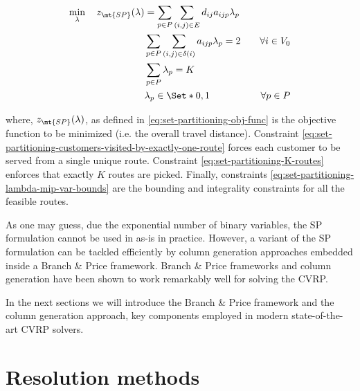 \begin{align}
	\min_{\lambda} \quad z_\mt{SP}(\lambda) & = \sum_{p \in P} \sum_{(i, j) \in E} d_{ij} a_{ijp} \lambda_p \label{eq:set-partitioning-obj-func}                                                                                                                                           \\
	                                        & \sum_{p \in P} \sum_{(i, j) \in \delta(i)} a_{ijp} \lambda_p = 2                                   & \quad \forall i \in V_0                                              \label{eq:set-partitioning-customers-visited-by-exactly-one-route} \\
	                                        & \sum_{p \in P} \lambda_{p} = K\label{eq:set-partitioning-K-routes}                                                                                                                                                                           \\
	                                        & \lambda_p                    \in \Set*{0, 1}                                                       & \quad \forall p \in P \label{eq:set-partitioning-lambda-mip-var-bounds}
\end{align}

where, $z_\mt{SP}(\lambda)$, as defined in \eqref{eq:set-partitioning-obj-func} is the objective function to be minimized (i.e. the overall travel distance).
Constraint \eqref{eq:set-partitioning-customers-visited-by-exactly-one-route} forces each customer to be served from a single unique route.
Constraint \eqref{eq:set-partitioning-K-routes} enforces that exactly $K$ routes are picked.
Finally, constraints \eqref{eq:set-partitioning-lambda-mip-var-bounds} are the bounding and integrality constraints for all the feasible routes.


As one may guess, due the exponential number of binary variables, the SP formulation cannot be used in as-is in practice.
However, a variant of the SP formulation can be tackled efficiently by column generation approaches embedded inside a Branch \& Price framework.
Branch \& Price frameworks and column generation have been shown to work remarkably well for solving the CVRP.

In the next sections we will introduce the Branch \& Price framework and the column generation approach, key components employed in modern state-of-the-art CVRP solvers.

\section{Resolution methods}
\label{sec:intro-resolution-methods}

